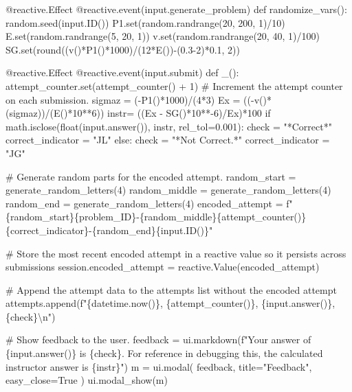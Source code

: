 \documentclass[
  letterpaper,
  DIV=11,
  numbers=noendperiod]{scrreprt}
\newenvironment{Shaded}{\begin{snugshade}}{\end{snugshade}}
\newcommand{\NormalTok}[1]{\textcolor[rgb]{0.00,0.23,0.31}{#1}}
\begin{document}
\begin{Shaded}
\begin{Highlighting}[]
\NormalTok{    @reactive.Effect}
\NormalTok{    @reactive.event(input.generate\_problem)}
\NormalTok{    def randomize\_vars():}
\NormalTok{        random.seed(input.ID())}
\NormalTok{        P1.set(random.randrange(20, 200, 1)/10)}
\NormalTok{        E.set(random.randrange(5, 20, 1))}
\NormalTok{        v.set(random.randrange(20, 40, 1)/100)}
\NormalTok{        SG.set(round((v()*P1()*1000)/(12*E()){-}(0.3{-}2)*0.1, 2))}
        
\NormalTok{    @reactive.Effect}
\NormalTok{    @reactive.event(input.submit)}
\NormalTok{    def \_():}
\NormalTok{        attempt\_counter.set(attempt\_counter() + 1)  \# Increment the attempt counter on each submission.}
\NormalTok{        sigmaz = ({-}P1()*1000)/(4*3)}
\NormalTok{        Ex = (({-}v()*(sigmaz))/(E()*10**6))}
\NormalTok{        instr=  ((Ex {-} SG()*10**{-}6)/Ex)*100}
\NormalTok{        if math.isclose(float(input.answer()), instr, rel\_tol=0.001):}
\NormalTok{            check = "*Correct*"}
\NormalTok{            correct\_indicator = "JL"}
\NormalTok{        else:}
\NormalTok{            check = "*Not Correct.*"}
\NormalTok{            correct\_indicator = "JG"}

\NormalTok{        \# Generate random parts for the encoded attempt.}
\NormalTok{        random\_start = generate\_random\_letters(4)}
\NormalTok{        random\_middle = generate\_random\_letters(4)}
\NormalTok{        random\_end = generate\_random\_letters(4)}
\NormalTok{        encoded\_attempt = f"\{random\_start\}\{problem\_ID\}{-}\{random\_middle\}\{attempt\_counter()\}\{correct\_indicator\}{-}\{random\_end\}\{input.ID()\}"}

\NormalTok{        \# Store the most recent encoded attempt in a reactive value so it persists across submissions}
\NormalTok{        session.encoded\_attempt = reactive.Value(encoded\_attempt)}

\NormalTok{        \# Append the attempt data to the attempts list without the encoded attempt}
\NormalTok{        attempts.append(f"\{datetime.now()\}, \{attempt\_counter()\}, \{input.answer()\}, \{check\}\textbackslash{}n")}

\NormalTok{        \# Show feedback to the user.}
\NormalTok{        feedback = ui.markdown(f"Your answer of \{input.answer()\} is \{check\}. For reference in debugging this, the calculated instructor answer is \{instr\}")}
\NormalTok{        m = ui.modal(}
\NormalTok{            feedback,}
\NormalTok{            title="Feedback",}
\NormalTok{            easy\_close=True}
\NormalTok{        )}
\NormalTok{        ui.modal\_show(m)}


\end{Highlighting}
\end{Shaded}
\end{document}
